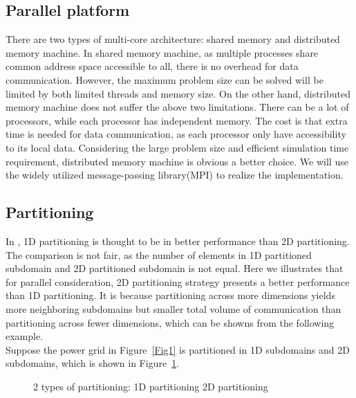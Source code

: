 \documentclass{sig-alternate}
\begin{document}
  \subsection{Parallel platform}
	There are two types of multi-core architecture: shared memory and distributed memory machine. In shared memory machine, as 
	multiple processes share common address space accessible to all, there is no overhead for data communication. However, the
	maximum problem size can be solved will be limited by both limited threads and memory size. On the other hand, distributed 
	memory machine does not suffer the above two limitations. There can be a lot of processors, while each processor has 
	independent memory. The cost is that extra time is needed 
	for data communication, as each processor only have accessibility to its local data. Considering the large problem size and
	efficient simulation time requirement, distributed memory machine is obvious a better choice. We will use the widely utilized
	message-passing library(MPI) to realize the implementation.
  \subsection{Partitioning}
	In \cite{Zhongyu}, 1D partitioning is thought to be in better performance than 2D partitioning. The comparison is not fair, 
	as the number of elements in 1D partitioned subdomain and 2D partitioned subdomain is not equal. Here we illustrates that
	for parallel consideration, 2D partitioning strategy presents a better performance than 1D 
	partitioning. It is because partitioning across more dimensions yields more neighboring subdomains but smaller total 
	volume of communication than partitioning across fewer dimensions, which can be showns from the following example.\\

	Suppose the power grid in Figure~\ref{Fig1} is partitioned in 1D subdomains and 2D subdomains, which is shown in 
	Figure~\ref{Fig3}.
	\begin{figure}[htbp]
	  \caption{2 types of partitioning:
	   1D partitioning
	   2D partitioning }
	  \label{Fig3}
	\end{figure}
\end{document}
